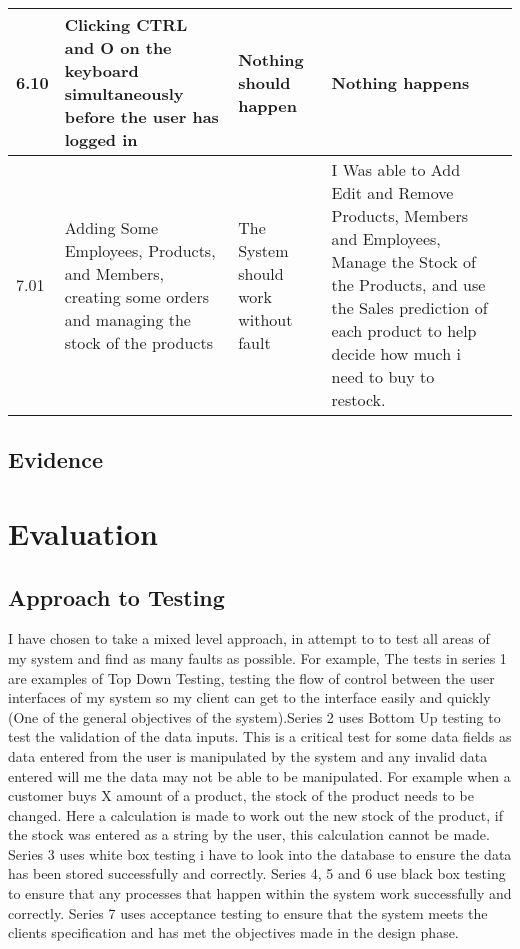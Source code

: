 \begin{flushleft}
\begin{longtable}{|p{1.0cm}|p{2.5cm}|p{3cm}|p{3.0cm}|p{2.5cm}|}
	6.10 & Clicking CTRL and O on the keyboard simultaneously before the user has logged in & Nothing should happen& Nothing happens &  \\ \hline
	7.01 & Adding Some Employees, Products, and Members, creating some orders and managing the stock of the products & The System should work without fault & I Was able to Add Edit and Remove Products, Members and Employees, Manage the Stock of the Products, and use the Sales prediction of each product to help decide how much i need to buy to restock. & \\ \hline
       \end{longtable}
\end{flushleft}
        
        
\subsection{Evidence}

\section{Evaluation}

\subsection{Approach to Testing}

I have chosen to take a mixed level approach, in attempt to to test all areas of my system and find as many faults as possible. For example,  The tests in series 1 are examples of Top Down Testing, testing the flow of control between the user interfaces of my system so my client can get to the interface easily and quickly (One of the general objectives of the system).Series 2 uses Bottom Up testing to test the validation of the data inputs. This is a critical test for some data fields as data entered from the user is manipulated by the system and any invalid data entered will me the data may not be able to be manipulated. For example when a customer buys X amount of a product, the stock of the product needs to be changed. Here a calculation is made to work out the new stock of the product, if the stock was entered as a string by the user, this calculation cannot be made. Series 3 uses white box testing i have to look into the database to ensure the data has been stored successfully and correctly. Series 4, 5 and 6 use black box testing to ensure that any processes that happen within the system work successfully and correctly. Series 7 uses acceptance testing to ensure that the system meets the clients specification and has met the objectives made in the design phase.

